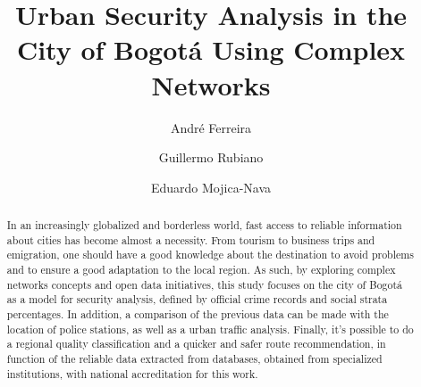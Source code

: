 \documentclass[runningheads]{llncs}
\begin{document}
\lstset{inputencoding=utf8/latin1}

%
\title{Urban Security Analysis in the City of Bogotá Using Complex Networks}
%
%
\author{André Ferreira \and
Guillermo Rubiano \and
Eduardo Mojica-Nava}
%
%
%
\maketitle              %
%
\begin{abstract}
In an increasingly globalized and borderless world, fast access to reliable information about cities has become almost a necessity. From tourism to business trips and emigration, one should have a good knowledge about the destination to avoid problems and to ensure a good adaptation to the local region. As such, by exploring complex networks concepts and open data initiatives, this study focuses on the city of Bogotá as a model for security analysis, defined by official crime records and social strata percentages. In addition, a comparison of the previous data can be made with the location of police stations, as well as a urban traffic analysis. Finally, it's possible to do a regional quality classification and a quicker and safer route recommendation, in function of the reliable data extracted from databases, obtained from specialized institutions, with national accreditation for this work.

\end{abstract}
\end{document}
